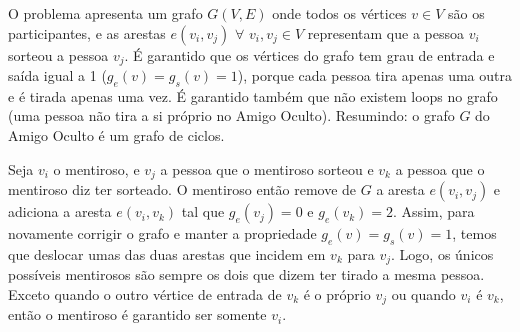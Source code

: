 O problema apresenta um grafo $G(V, E)$ onde todos os vértices $v \in V$ são os participantes, e
as arestas $e(v_i, v_j)$ $\forall$ $v_i, v_j \in V$ representam que a pessoa $v_i$ sorteou a pessoa $v_j$. 
É garantido que
os vértices do grafo tem grau de entrada e saída igual a 1 ($g_e(v) = g_s(v) = 1$), porque cada pessoa 
tira apenas uma outra e é tirada apenas uma vez. É garantido também que não existem loops no grafo 
(uma pessoa não tira a si próprio no Amigo Oculto). Resumindo: o grafo $G$ do Amigo Oculto é um grafo de
ciclos.

Seja $v_i$ o mentiroso, e $v_j$ a pessoa que o mentiroso sorteou e $v_k$ a pessoa que o mentiroso diz
ter sorteado. O mentiroso então remove de $G$ a aresta $e(v_i, v_j)$ e adiciona a aresta $e(v_i, v_k)$ 
tal que $g_e(v_j) = 0$ e $g_e(v_k) = 2$. Assim, para novamente corrigir o grafo e manter a propriedade
$g_e(v) = g_s(v) = 1$, temos que deslocar umas das duas arestas que incidem em $v_k$ para $v_j$. Logo,
os únicos possíveis mentirosos são sempre os dois que dizem ter tirado a mesma pessoa. Exceto quando
o outro vértice de entrada de $v_k$ é o próprio $v_j$ ou quando $v_i$ é $v_k$, então o mentiroso é 
garantido ser somente $v_i$.
